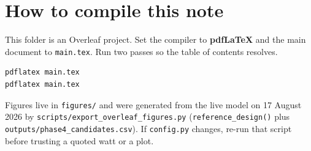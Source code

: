 \documentclass[11pt,letterpaper]{article}
\newcommand{\code}[1]{\texttt{#1}}
\begin{document}
\section{How to compile this note}

This folder is an Overleaf project. Set the compiler to \textbf{pdfLaTeX} and the main document to \code{main.tex}. Run two passes so the table of contents resolves.

\begin{verbatim}
pdflatex main.tex
pdflatex main.tex
\end{verbatim}

Figures live in \code{figures/} and were generated from the live model on 17 August 2026 by \code{scripts/export\_overleaf\_figures.py} (\code{reference\_design()} plus \code{outputs/phase4\_candidates.csv}). If \code{config.py} changes, re-run that script before trusting a quoted watt or a plot.
\end{document}
